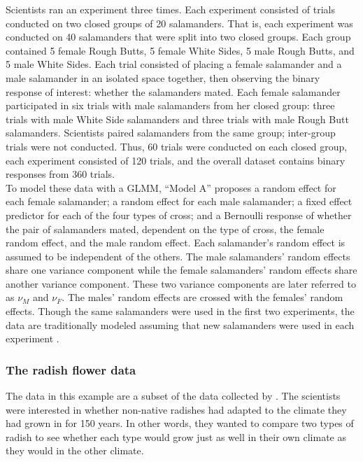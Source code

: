 \documentclass[article]{jss}
\begin{document}
Scientists ran an experiment three times. Each experiment consisted of trials conducted on two closed groups of 20 salamanders. That is, each experiment was conducted on 40 salamanders that were split into two closed groups.  Each group contained 5 female Rough Butts, 5 female White Sides, 5 male Rough Butts, and 5 male White Sides.  Each trial consisted of placing a  female salamander and a  male salamander in an isolated space together, then observing the binary response of interest: whether the salamanders mated.  Each female salamander participated in six trials with male salamanders from her closed group:  three trials with male White Side salamanders and three trials with male Rough Butt salamanders. Scientists paired salamanders from the same group; inter-group trials were not conducted. Thus, 60 trials were conducted on each closed group, each experiment consisted of 120 trials, and the overall dataset contains binary responses from 360 trials. \\


 To model these data with a GLMM,  ``Model A'' \citep{karim:zeger:1992} proposes
a random effect for each female salamander; a random effect for each male salamander; a fixed effect predictor for each of the four types of cross; and a Bernoulli response of whether the pair of salamanders mated, dependent on the type of cross, the female random effect, and the male random effect. 
 Each salamander's random effect is assumed to be independent of the others.  The male salamanders' random effects share one variance component  while the female salamanders' random effects share another variance component. These two variance components are later referred to as $\nu_M$ and $\nu_F$. The males' random effects are crossed with the females' random effects. Though the same salamanders were used in the first two experiments, the data are traditionally modeled assuming that new salamanders were used in each experiment \citep{booth:hobert:1999,  karim:zeger:1992,  mcc:nelder:1989}.\\

\subsubsection{The radish flower data}

The data in this example are a subset of the data collected by \citet{ridley:ellstrand:2010}. The scientists were interested in whether non-native radishes had adapted to the climate they had  grown in for 150 years. In other words, they wanted to compare two types of radish to see whether each type would grow just as well in their own climate as they would in the other climate. \\
\end{document}
